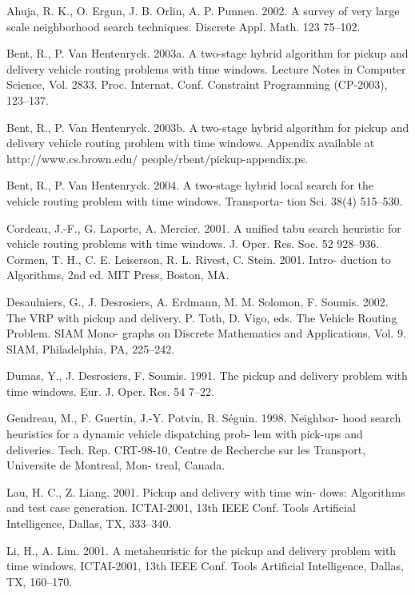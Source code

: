 \begin{thebibliography}{9}
	Ahuja, R. K., O. Ergun, J. B. Orlin, A. P. Punnen. 2002. A survey of very large scale neighborhood search techniques. Discrete Appl. Math. 123 75–102.

	Bent, R., P. Van Hentenryck. 2003a. A two-stage hybrid algorithm for pickup and delivery vehicle routing problems with time windows. Lecture Notes in Computer Science, Vol. 2833. Proc. Internat. Conf. Constraint Programming (CP-2003), 123–137.

	Bent, R., P. Van Hentenryck. 2003b. A two-stage hybrid algorithm for pickup and delivery vehicle routing problem with time windows. Appendix available at http://www.cs.brown.edu/ people/rbent/pickup-appendix.ps.

	Bent, R., P. Van Hentenryck. 2004. A two-stage hybrid local search for the vehicle routing problem with time windows. Transporta- tion Sci. 38(4) 515–530.

	Cordeau, J.-F., G. Laporte, A. Mercier. 2001. A unified tabu search heuristic for vehicle routing problems with time windows. J. Oper. Res. Soc. 52 928–936.
	Cormen, T. H., C. E. Leiserson, R. L. Rivest, C. Stein. 2001. Intro- duction to Algorithms, 2nd ed. MIT Press, Boston, MA.

	Desaulniers, G., J. Desrosiers, A. Erdmann, M. M. Solomon, F. Soumis. 2002. The VRP with pickup and delivery. P. Toth, D. Vigo, eds. The Vehicle Routing Problem. SIAM Mono- graphs on Discrete Mathematics and Applications, Vol. 9. SIAM, Philadelphia, PA, 225–242.

	Dumas, Y., J. Desrosiers, F. Soumis. 1991. The pickup and delivery problem with time windows. Eur. J. Oper. Res. 54 7–22.

	Gendreau, M., F. Guertin, J.-Y. Potvin, R. Séguin. 1998. Neighbor- hood search heuristics for a dynamic vehicle dispatching prob- lem with pick-ups and deliveries. Tech. Rep. CRT-98-10, Centre de Recherche sur les Transport, Universite de Montreal, Mon- treal, Canada.

	Lau, H. C., Z. Liang. 2001. Pickup and delivery with time win- dows: Algorithms and test case generation. ICTAI-2001, 13th IEEE Conf. Tools Artificial Intelligence, Dallas, TX, 333–340.

	Li, H., A. Lim. 2001. A metaheuristic for the pickup and delivery problem with time windows. ICTAI-2001, 13th IEEE Conf. Tools Artificial Intelligence, Dallas, TX, 160–170.


\end{thebibliography}
